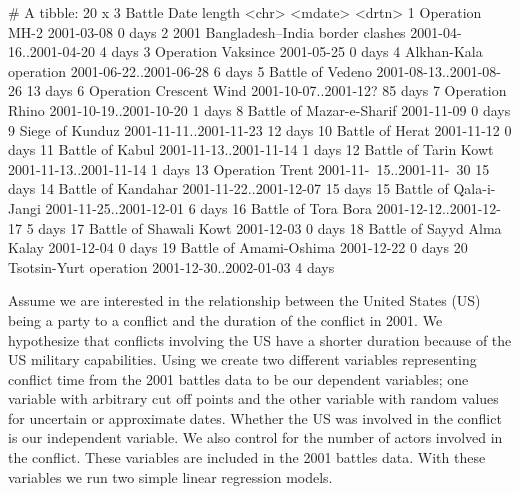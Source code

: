 \documentclass[
]{jss}
\begin{document}
\begin{CodeChunk}
\begin{CodeOutput}
# A tibble: 20 x 3
   Battle                               Date                     length 
   <chr>                                <mdate>                  <drtn> 
 1 Operation MH-2                       2001-03-08                0 days
 2 2001 Bangladesh–India border clashes 2001-04-16..2001-04-20    4 days
 3 Operation Vaksince                   2001-05-25                0 days
 4 Alkhan-Kala operation                2001-06-22..2001-06-28    6 days
 5 Battle of Vedeno                     2001-08-13..2001-08-26   13 days
 6 Operation Crescent Wind              2001-10-07..2001-12?     85 days
 7 Operation Rhino                      2001-10-19..2001-10-20    1 days
 8 Battle of Mazar-e-Sharif             2001-11-09                0 days
 9 Siege of Kunduz                      2001-11-11..2001-11-23   12 days
10 Battle of Herat                      2001-11-12                0 days
11 Battle of Kabul                      2001-11-13..2001-11-14    1 days
12 Battle of Tarin Kowt                 2001-11-13..2001-11-14    1 days
13 Operation Trent                      2001-11-~15..2001-11-~30 15 days
14 Battle of Kandahar                   2001-11-22..2001-12-07   15 days
15 Battle of Qala-i-Jangi               2001-11-25..2001-12-01    6 days
16 Battle of Tora Bora                  2001-12-12..2001-12-17    5 days
17 Battle of Shawali Kowt               2001-12-03                0 days
18 Battle of Sayyd Alma Kalay           2001-12-04                0 days
19 Battle of Amami-Oshima               2001-12-22                0 days
20 Tsotsin-Yurt operation               2001-12-30..2002-01-03    4 days
\end{CodeOutput}
\end{CodeChunk}

Assume we are interested in the relationship between the United States
(US) being a party to a conflict and the duration of the conflict in
2001. We hypothesize that conflicts involving the US have a shorter
duration because of the US military capabilities. Using 
we create two different variables representing conflict time from the
2001 battles data to be our dependent variables; one variable with
arbitrary cut off points and the other variable with random values for
uncertain or approximate dates. Whether the US was involved in the
conflict is our independent variable. We also control for the number of
actors involved in the conflict. These variables are included in the
2001 battles data. With these variables we run two simple linear
regression models.
\end{document}
